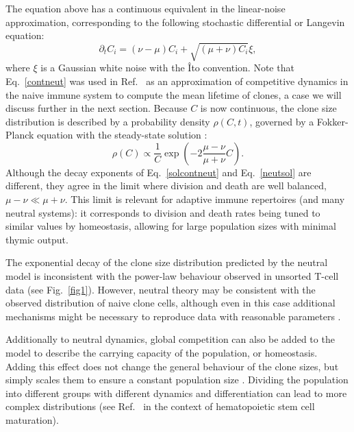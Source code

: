 \documentclass[aps,pre,twocolumn,superscriptaddress,groupedaddress]{revtex4}
\newcommand{\beq}{\begin{equation}}
\newcommand{\eeq}{\end{equation}}
\newcommand{\<}{\langle}
\renewcommand{\>}{\rangle}
\begin{document}
The equation above has a continuous equivalent in the linear-noise approximation, corresponding to the following stochastic differential or Langevin equation:
\beq
\partial_t C_i = (\nu-\mu) C_i + \sqrt{(\mu+\nu)C_i} \xi,
\label{contneut}
\eeq
where $\xi$ is a Gaussian white noise with the \^Ito convention. Note that Eq.~\ref{contneut} was used in Ref.~\cite{Lythe2016} as an approximation of competitive dynamics in the naive immune system to compute the mean lifetime of clones, a case we will discuss further in the next section.
Because $C$ is now continuous, the clone size distribution is described by a probability density $\rho(C,t)$, governed by a Fokker-Planck equation with the steady-state solution \cite{desponds2016}:
\beq
\rho(C) \propto \frac{1}{C}\exp\left( -2\frac{\mu-\nu}{\mu+\nu}C\right).
\label{solcontneut}
\eeq
Although the decay exponents of Eq.~\ref{solcontneut} and Eq.~\ref{neutsol} are different, they agree in the limit where division and death are well balanced, $\mu-\nu \ll \mu+\nu$. This limit is relevant for adaptive immune repertoires (and many neutral systems): it corresponds to division and death rates being tuned to similar values by homeostasis, allowing for large population sizes with minimal thymic output.

The exponential decay of the clone size distribution predicted by the neutral model is inconsistent with the power-law behaviour observed in unsorted T-cell data (see Fig.~\ref{fig1}). However, neutral theory may be consistent with the observed distribution of naive clone cells, although even in this case additional
 mechanisms might be necessary to reproduce data with reasonable parameters \cite{deBoerChain}.

Additionally to neutral dynamics, global competition can also be added to the model to describe the carrying capacity of the population, or homeostasis. Adding this effect does not change the general behaviour of the clone sizes, but simply scales them to ensure a constant population size \cite{desponds2016}. Dividing the population into different groups with different dynamics and differentiation can lead to more complex distributions (see Ref.~\cite{Goyal2015} in the context of hematopoietic stem cell maturation). 
 
\end{document}
